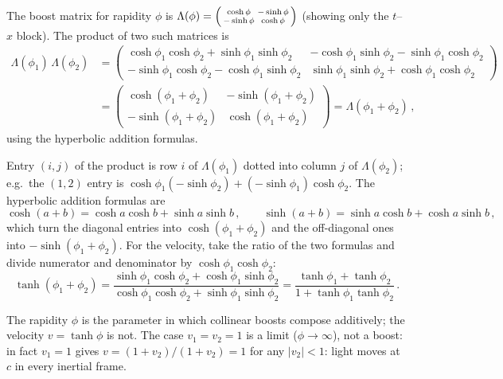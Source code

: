 The boost matrix for rapidity $\phi$ is
$\Lambda(\phi) = \begin{psmallmatrix} \cosh\phi & -\sinh\phi \\ -\sinh\phi & \cosh\phi \end{psmallmatrix}$
(showing only the $t$--$x$ block).  The product of two such matrices is
\begin{align*}
    \Lambda(\phi_1)\,\Lambda(\phi_2)
    &= \begin{pmatrix}
        \cosh\phi_1\cosh\phi_2 + \sinh\phi_1\sinh\phi_2 &
        -\cosh\phi_1\sinh\phi_2 - \sinh\phi_1\cosh\phi_2 \\
        -\sinh\phi_1\cosh\phi_2 - \cosh\phi_1\sinh\phi_2 &
        \sinh\phi_1\sinh\phi_2 + \cosh\phi_1\cosh\phi_2
    \end{pmatrix} \\
    &= \begin{pmatrix}
        \cosh(\phi_1+\phi_2) & -\sinh(\phi_1+\phi_2) \\
        -\sinh(\phi_1+\phi_2) & \cosh(\phi_1+\phi_2)
    \end{pmatrix}
    = \Lambda(\phi_1 + \phi_2) \,,
\end{align*}
using the hyperbolic addition formulas.

\begin{derivation}
Entry $(i,j)$ of the product is row $i$ of $\Lambda(\phi_1)$ dotted into column $j$ of
$\Lambda(\phi_2)$; e.g.\ the $(1,2)$ entry is
$\cosh\phi_1(-\sinh\phi_2) + (-\sinh\phi_1)\cosh\phi_2$. The hyperbolic addition formulas are
\[
    \cosh(a+b) = \cosh a\cosh b + \sinh a\sinh b \,, \qquad
    \sinh(a+b) = \sinh a\cosh b + \cosh a\sinh b \,,
\]
which turn the diagonal entries into $\cosh(\phi_1+\phi_2)$ and the off-diagonal ones into
$-\sinh(\phi_1+\phi_2)$. For the velocity, take the ratio of the two formulas and divide
numerator and denominator by $\cosh\phi_1\cosh\phi_2$:
\[
    \tanh(\phi_1+\phi_2)
    = \frac{\sinh\phi_1\cosh\phi_2 + \cosh\phi_1\sinh\phi_2}{\cosh\phi_1\cosh\phi_2 + \sinh\phi_1\sinh\phi_2}
    = \frac{\tanh\phi_1 + \tanh\phi_2}{1 + \tanh\phi_1\tanh\phi_2} \,.
\]
\end{derivation}

\begin{annotation}
The rapidity $\phi$ is the parameter in which collinear boosts compose additively; the velocity
$v = \tanh\phi$ is not. The case $v_1 = v_2 = 1$ is a limit ($\phi \to \infty$), not a boost: in
fact $v_1 = 1$ gives $v = (1+v_2)/(1+v_2) = 1$ for any $|v_2| < 1$: light moves at $c$ in every
inertial frame.
\end{annotation}

